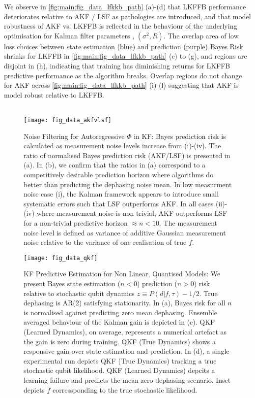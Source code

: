 We observe in \cref{fig:main:fig_data_lfkkb_path} (a)-(d) that LKFFB performance deteriorates relative to AKF / LSF as pathologies are introduced, and that model robustness of AKF vs. LKFFB is reflected in the behaviour of the underlying optimisation for Kalman filter parameters , $(\sigma^2, R)$. The overlap area of low loss choices between state estimation (blue) and prediction (purple) Bayes Risk shrinks for LKFFB in \cref{fig:main:fig_data_lfkkb_path} (e) to (g), and regions are disjoint in (h), indicating that training has diminishing returns for LKFFB predictive performance as the algorithm breaks. Overlap regions do not change for AKF across \cref{fig:main:fig_data_lfkkb_path} (i)-(l) suggesting that AKF is model robust relative to LKFFB.
\\
\\
\begin{figure}
    \caption{\label{fig:main:fig_data_akfvlsf} Noise Filtering for Autoregressive $\Phi$ in KF: Bayes prediction risk is calculated as measurement noise levels increase from (i)-(iv). The ratio of normalised Bayes prediction risk (AKF/LSF) is presented in (a).  In (b), we confirm that the ratios in (a) correspond to a competitively desirable prediction horizon where algorithms do better than predicting the dephasing noise mean. In low measurment noise case (i), the Kalman framework appears to introduce small systematic errors such that LSF outperforms AKF. In all cases (ii)-(iv) where measurement noise is non trivial, AKF outperforms LSF for a non-trivial predictive horizon $ \approx n < 10$.  The measurement noise level is defined as variance of additive Gaussian measurement noise relative to the variance of one realisation of true $f$.}
    \texttt{[image: fig\_data\_akfvlsf]}
\end{figure}
\begin{figure}[h!]
    \caption{\label{fig:main:fig_data_qkf2} KF Predictive Estimation for Non Linear, Quantised Models: We present Bayes state estimation ($n<0$) prediction ($n>0$) risk relative to stochastic qubit dynamics $z \equiv P(d | f, \tau) - 1/2$. True dephasing is AR(2) satisfying stationarity.  In (a), Bayes risk for all $n$ is normalised against predicting zero mean dephasing. Ensemble averaged behaviour of the Kalman gain is depicted in (c). QKF (Learned Dynamics), on average, represents a numerical artefact as the gain is zero during training. QKF (True Dynamics) shows a responsive gain over state estimation and prediction. In (d), a single experimental run depicts QKF (True Dynamics) tracking a true stochastic qubit likelihood. QKF (Learned Dynamics) depcits a learning failure and predicts the mean zero dephasing scenario. Inset depicts $f$ corressponding to the true stochastic likelihood.}
    \texttt{[image: fig\_data\_qkf]}
\end{figure}

